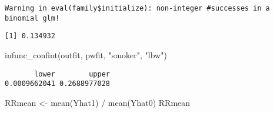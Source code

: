 \documentclass[
  letterpaper,
  DIV=11,
  numbers=noendperiod]{scrartcl}
\newenvironment{Shaded}{\begin{snugshade}}{\end{snugshade}}
\newcommand{\AttributeTok}[1]{\textcolor[rgb]{0.40,0.45,0.13}{#1}}
\newcommand{\DecValTok}[1]{\textcolor[rgb]{0.68,0.00,0.00}{#1}}
\newcommand{\DocumentationTok}[1]{\textcolor[rgb]{0.37,0.37,0.37}{\textit{#1}}}
\newcommand{\FunctionTok}[1]{\textcolor[rgb]{0.28,0.35,0.67}{#1}}
\newcommand{\NormalTok}[1]{\textcolor[rgb]{0.00,0.23,0.31}{#1}}
\newcommand{\OtherTok}[1]{\textcolor[rgb]{0.00,0.23,0.31}{#1}}
\newcommand{\SpecialCharTok}[1]{\textcolor[rgb]{0.37,0.37,0.37}{#1}}
\newcommand{\StringTok}[1]{\textcolor[rgb]{0.13,0.47,0.30}{#1}}
\begin{document}
\begin{verbatim}
Warning in eval(family$initialize): non-integer #successes in a binomial glm!
\end{verbatim}

\begin{Shaded}
\end{Shaded}

\begin{verbatim}
[1] 0.134932
\end{verbatim}

\begin{Shaded}
\begin{Highlighting}[]
\FunctionTok{infunc\_confint}\NormalTok{(outfit, pwfit, }\StringTok{"smoker"}\NormalTok{, }\StringTok{"lbw"}\NormalTok{)}
\end{Highlighting}
\end{Shaded}

\begin{verbatim}
       lower        upper 
0.0009662041 0.2688977028 
\end{verbatim}

\begin{Shaded}
\begin{Highlighting}[]
\NormalTok{RRmean }\OtherTok{\textless{}{-}} \FunctionTok{mean}\NormalTok{(Yhat1) }\SpecialCharTok{/} \FunctionTok{mean}\NormalTok{(Yhat0)}
\NormalTok{RRmean}
\end{Highlighting}
\end{Shaded}
\end{document}

